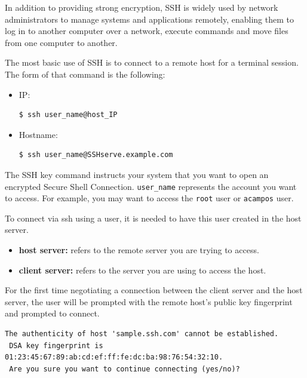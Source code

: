 \documentclass{article}
\newenvironment{blocktemplate}[1]{%
    \tcolorbox[beamer,%
    noparskip,breakable,
    colframe=Blue,%
    colbacklower=LimeGreen!75!LightGreen,%
    title=#1]}%
    {\endtcolorbox}
\newenvironment{codetemplate}[1][]{%
  \mybasecolorbox[#1]
  \itshape
}{%
  \endmybasecolorbox
}
\begin{document}
In addition to providing strong encryption, SSH is widely used by network administrators to manage systems and applications remotely, enabling them to log in to another computer over a network, execute commands and move files from one computer to another.


The most basic use of SSH is to connect to a remote host for a terminal session. The form of that command is the following:
\begin{itemize}
    \item IP:
\begin{codetemplate}{}
\begin{verbatim}
$ ssh user_name@host_IP
\end{verbatim}
\end{codetemplate}
    \item Hostname:
\begin{codetemplate}{}
\begin{verbatim}
$ ssh user_name@SSHserve.example.com
\end{verbatim}
\end{codetemplate}   
\end{itemize}


The SSH key command instructs your system that you want to open an encrypted Secure Shell Connection. \verb|user_name| represents the account you want to access. For example, you may want to access the \verb|root| user or \verb|acampos| user.

\begin{blocktemplate}{Note}
To connect via ssh using a user, it is needed to have this user created in the host server.

\begin{itemize}
    \item \textbf{host server:} refers to the remote server you are trying to access.
    \item \textbf{client server:} refers to the server you are using to access the host.
\end{itemize}
\end{blocktemplate}

For the first time negotiating a connection between the client server and the host server, the user will be prompted with the remote host's public key fingerprint and prompted to connect.

\begin{codetemplate}{}
\begin{verbatim}
The authenticity of host 'sample.ssh.com' cannot be established.
 DSA key fingerprint is 01:23:45:67:89:ab:cd:ef:ff:fe:dc:ba:98:76:54:32:10.
 Are you sure you want to continue connecting (yes/no)?
\end{verbatim}
\end{codetemplate}
\end{document}
